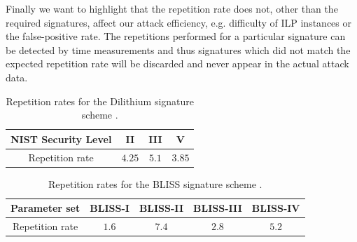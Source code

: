 Finally we want to highlight that the repetition rate does not, other than the required signatures, affect our attack efficiency, e.g. difficulty of ILP instances or the false-positive rate. The repetitions performed for a particular signature can be detected by time measurements and thus signatures which did not match the expected repetition rate will be discarded and never appear in the actual attack data.



\begin{table}
\centering
\begin{tabular}{ c c c c }
 NIST Security Level & II & III & V \\ 
 \hline
 Repetition rate & $4.25$ & $5.1$ & $3.85$ \\  
\end{tabular}\vspace{1em}
\caption{Repetition rates for the Dilithium signature scheme \cite[p.~16]{dilithium_spec}.}
\label{table:dilithium}
\end{table}

\begin{table}
\centering
\begin{tabular}{ c c c c c }
 Parameter set & BLISS-I & BLISS-II & BLISS-III & BLISS-IV \\ 
 \hline
 Repetition rate & $1.6$ & $7.4$ & $2.8$ & $5.2$ \\  
\end{tabular}\vspace{1em}
\caption{Repetition rates for the BLISS signature scheme \cite[p.~24]{bliss_full}.}
\label{table:bliss}
\end{table}
